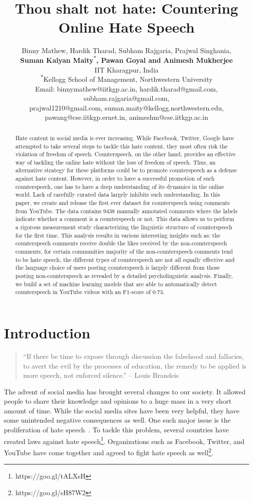 \documentclass[11pt,a4paper]{article}
\title{Thou shalt not hate: Countering Online Hate Speech}
\author{Binny Mathew, Hardik Tharad, Subham Rajgaria,  Prajwal Singhania,\\
\textbf{Suman Kalyan Maity\textsuperscript{$*$}, Pawan Goyal and Animesh Mukherjee}\\
IIT Kharagpur, India\\
\textsuperscript{$*$}Kellogg School of Management, Northwestern University\\
Email: binnymathew@iitkgp.ac.in, hardik.tharad@gmail.com, subham.rajgaria@gmail.com, \\
prajwal1210@gmail.com, 
suman.maity@kellogg.northwestern.edu, \\
pawang@cse.iitkgp.ernet.in, 
animeshm@cse.iitkgp.ac.in
}
\date{}
\begin{document}
\maketitle
\begin{abstract}
Hate content in social media is ever increasing. While Facebook, Twitter, Google have attempted to take several steps to tackle this hate content, they most often risk the violation of freedom of speech. Counterspeech, on the other hand, provides an effective way of tackling the online hate without the loss of freedom of speech. Thus, an alternative strategy for these platforms could be to promote counterspeech as a defense against hate content. However, in order to have a successful promotion of such counterspeech, one has to have a deep understanding of its dynamics in the online world. Lack of carefully curated data largely inhibits such understanding. In this paper, we create and release the first ever dataset for counterspeech using comments from YouTube. The data contains 9438 manually annotated comments where the labels indicate whether a comment is a counterspeech or not. This data allows us to perform a rigorous measurement study characterizing the linguistic structure of counterspeech for the first time. This analysis results in various interesting insights such as: the counterspeech comments receive double the likes received by the non-counterspeech comments, for certain communities majority of the non-counterspeech comments tend to be hate speech, the different types of counterspeech are not all equally effective and the language choice of users posting counterspeech is largely different from those posting non-counterspeech as revealed by a detailed psycholinguistic analysis. Finally, we build a set of machine learning models that are able to automatically detect counterspeech in YouTube videos with an F1-score of 0.73. 
\end{abstract}


\section{Introduction}

\begin{quote}
``If there be time to expose through discussion the falsehood and fallacies, to avert the evil by the processes of education, the remedy to be applied is more speech, not enforced silence.'' -- Louis Brandeis  
\end{quote}

\vspace{-5mm}
The advent of social media has brought several changes to our society. It allowed people to share their knowledge and opinions to a huge mass in a very short amount of time. While the social media sites have been very helpful, they have some unintended negative consequences as well. One such major issue is the proliferation of hate speech~\cite{massaro1990equality}. To tackle this problem, several countries have created laws against hate speech\footnote{https://goo.gl/tALXsH}. Organizations such as Facebook, Twitter, and YouTube have come together and agreed to fight hate speech as well\footnote{https://goo.gl/sH87W2}.
\end{document}
